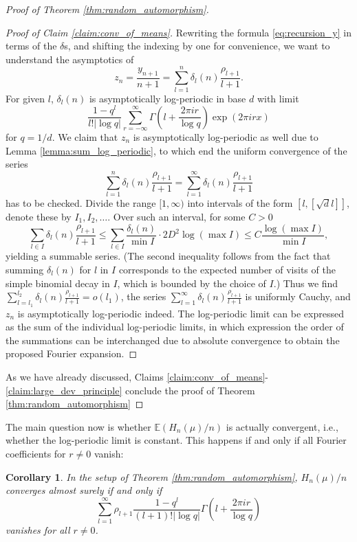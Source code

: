 \documentclass[11pt]{article}
\newcommand{\EE}{\mathbb{E}}
\newtheorem{corollary}[theorem]{Corollary}
\theoremstyle{definition}
\begin{document}
\begin{proof}[Proof of Theorem \ref{thm:random_automorphism}]
\begin{proof}[Proof of Claim \ref{claim:conv_of_means}]
    
    Rewriting the formula \eqref{eq:recursion_y} in terms of the $\delta$s, and shifting the indexing by one for convenience, we want to understand the asymptotics of
    $$z_{n} = \frac{y_{n+1}}{n+1}=\sum_{l=1}^{n}\delta_l(n)\frac{\rho_{l+1}}{l+1}.$$
    For given $l$, $\delta_l(n)$ is asymptotically log-periodic in base $d$ with limit
    $$\frac{1-q^l}{l! |\log q|}\sum_{r=-\infty}^{\infty}\Gamma\left(l+\frac{2\pi i r}{\log q}\right)\exp (2\pi i r x)$$
    for $q=1/d$. We claim that $z_n$ is asymptotically log-periodic as well due to Lemma \ref{lemma:sum_log_periodic}, to which end the uniform convergence of the series
    $$\sum_{l=1}^{n}\delta_l(n)\frac{\rho_{l+1}}{l+1} = \sum_{l=1}^{\infty}\delta_l(n)\frac{\rho_{l+1}}{l+1}$$
    has to be checked. Divide the range $[1, \infty)$ into intervals of the form $[l, [\sqrt d l]]$, denote these by $I_1, I_2, \dots$. Over such an interval, for some $C>0$
    $$\sum_{l\in I}\delta_l(n)\frac{\rho_{l+1}}{l+1}\leq \sum_{l\in I}\frac{\delta_l(n)}{\min I}\cdot 2D^2 \log(\max I)\leq C\frac{\log(\max I)}{\min I},$$
    yielding a summable series.  (The second inequality follows from the fact that summing $\delta_l(n)$ for $l$ in $I$ corresponds to the expected number of visits of the simple binomial decay in $I$, which is bounded by the choice of $I$.) Thus we find $\sum_{l=l_1}^{l_2}\delta_l(n)\frac{\rho_{l+1}}{l+1}=o(l_1)$, the series $\sum_{l=1}^{\infty}\delta_l(n)\frac{\rho_{l+1}}{l+1}$ is uniformly Cauchy, and $z_n$ is asymptotically log-periodic indeed. The log-periodic limit can be expressed as the sum of the individual log-periodic limits, in which expression the order of the summations can be interchanged due to absolute convergence to obtain the proposed Fourier expansion.  
\end{proof}

    As we have already discussed, Claims \ref{claim:conv_of_means}-\ref{claim:large_dev_principle} conclude the proof of Theorem \ref{thm:random_automorphism}
\end{proof}

The main question now is whether $\EE (H_n(\mu) / n)$ is actually convergent, i.e., whether the log-periodic limit is constant. This happens if and only if all Fourier coefficients for $r\neq 0$ vanish:

\begin{corollary}
    In the setup of Theorem \ref{thm:random_automorphism}, $H_n(\mu)/n$ converges almost surely if and only if 
    $$\sum_{l=1}^{\infty}\rho_{l+1}\frac{1-q^l}{(l+1)! |\log q|}\Gamma\left(l+\frac{2\pi i r}{\log q}\right)$$
    vanishes for all $r\neq 0$.
\end{corollary}
\end{document}
